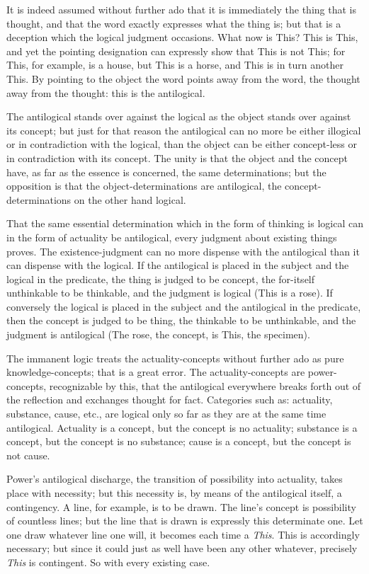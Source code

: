 \documentclass[12pt]{book}
\begin{document}
It is indeed assumed without further ado that it is immediately the
thing that is thought, and that the word exactly expresses what the
thing is; but that is a deception which the logical judgment
occasions. What now is This? This is This, and yet the pointing
designation can expressly show that This is not This; for This, for
example, is a house, but This is a horse, and This is in turn
another This. By pointing to the object the word points away from
the word, the thought away from the thought: this is the
antilogical.

The antilogical stands over against the logical as the object stands
over against its concept; but just for that reason the antilogical
can no more be either illogical or in contradiction with the
logical, than the object can be either concept-less or in
contradiction with its concept. The unity is that the object and the
concept have, as far as the essence is concerned, the same
determinations; but the opposition is that the object-determinations
are antilogical, the concept-determinations on the other hand
logical.

That the same essential determination which in the form of thinking
is logical can in the form of actuality be antilogical, every
judgment about existing things proves. The existence-judgment can no
more dispense with the antilogical than it can dispense with the
logical. If the antilogical is placed in the subject and the logical
in the predicate, the thing is judged to be concept, the for-itself
unthinkable to be thinkable, and the judgment is logical (This is a
rose). If conversely the logical is placed in the subject and the
antilogical in the predicate, then
the concept is judged to be thing, the thinkable to be unthinkable,
and the judgment is antilogical (The rose, the concept, is This, the
specimen).

The immanent logic treats the actuality-concepts without further ado
as pure knowledge-concepts; that is a great error. The
actuality-concepts are power-concepts, recognizable by this, that
the antilogical everywhere breaks forth out of the reflection and
exchanges thought for fact. Categories such as: actuality,
substance, cause, etc., are logical only so far as they are at the
same time antilogical. Actuality is a concept, but the concept is no
actuality; substance is a concept, but the concept is no substance;
cause is a concept, but the concept is not cause.

Power's antilogical discharge, the transition of possibility into
actuality, takes place with necessity; but this necessity is, by
means of the antilogical itself, a contingency. A line, for example,
is to be drawn. The line's concept is possibility of countless
lines; but the line that is drawn is expressly this determinate one.
Let one draw whatever line one will, it becomes each time a
\emph{This}. This is accordingly necessary; but since it could just
as well have been any other whatever, precisely \emph{This} is
contingent. So with every existing case.
\end{document}

